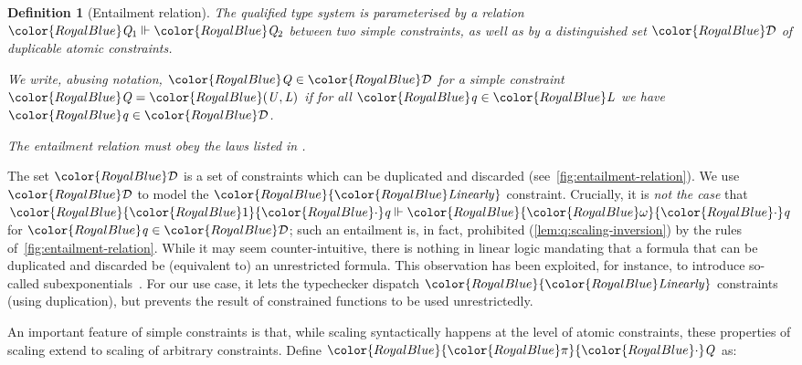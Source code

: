 \documentclass[acmsmall,usenames,dvipsnames,natbib=false,acmthm=false,screen]{acmart}
\newcommand{\Conid}[1]{\mathit{#1}}
\newcommand{\info}[2][1=]{}
\newcommand{\constraintcolour}{\color{RoyalBlue}}
\newcommand{\constraintfont}[1]{{\constraintcolour#1}}
\newcommand{\multiplicitycolour}{\color{RoyalBlue}}
\newcommand{\multiplicityfont}[1]{{\multiplicitycolour#1}}
\newcommand{\scale}{\constraintfont{\cdot}}
\theoremstyle{acmplain}
\theoremstyle{acmdefinition}
\newtheorem{definition}[theorem]{Definition}
\begin{document}
\begin{definition}[Entailment relation]
  \label{def:entailment-relation}
  The qualified type system is parameterised by a relation
  $ \constraintfont{ \ottnt{Q_{{\mathrm{1}}}} }   \Vdash   \constraintfont{ \ottnt{Q_{{\mathrm{2}}}} } $ between two simple constraints, as well as by a
  distinguished set $ \constraintfont{\mathcal{D} } $ of duplicable atomic constraints.

  We write, abusing notation, $  \constraintfont{ \ottnt{Q} }   \in  \constraintfont{\mathcal{D} } $ for a simple constraint
  $  \constraintfont{ \ottnt{Q} }  =  \constraintfont{ \ottsym{(}  \ottnt{U}  \ottsym{,}  \ottnt{L}  \ottsym{)} }  $ if for all $  \constraintfont{ \ottnt{q} }  \in  \constraintfont{ \ottnt{L} }  $ we
  have $  \constraintfont{ \ottnt{q} }   \in  \constraintfont{\mathcal{D} } $.

  The entailment relation must obey the laws listed in
  .
\end{definition}
%
\info{See Fig 3, p14 of OutsideIn\cite{OutsideIn}.}
%
The set $ \constraintfont{\mathcal{D} } $ is a set of constraints which can be duplicated and
discarded (see~\cref{fig:entailment-relation}). We use $ \constraintfont{\mathcal{D} } $ to
model the \ensuremath{\constraintfont{\constraintfont{\Conid{Linearly}}}} constraint. Crucially, it is \emph{not
  the case} that $ \constraintfont{   \multiplicityfont{ \ottsym{1} }  \scale \ottnt{q}  }   \Vdash   \constraintfont{   \multiplicityfont{ \omega }  \scale \ottnt{q}  } $ for $  \constraintfont{ \ottnt{q} }   \in  \constraintfont{\mathcal{D} } $; such an
entailment is, in fact, prohibited (\cref{lem:q:scaling-inversion}) by
the rules of~\cref{fig:entailment-relation}. While it may seem
counter-intuitive, there is nothing in linear logic mandating that a
formula that can be duplicated and discarded be (equivalent to) an
unrestricted formula. This observation has been exploited, for
instance, to introduce so-called
subexponentials~\cite{subexponentials}. For our use case, it lets the
typechecker dispatch \ensuremath{\constraintfont{\constraintfont{\Conid{Linearly}}}} constraints (using
duplication), but prevents the result of constrained functions to be used
unrestrictedly.

An important feature of simple constraints is that, while scaling
syntactically happens at the level of atomic constraints, these properties
of scaling extend to scaling of arbitrary constraints. Define
$  \constraintfont{   \multiplicityfont{ \pi }  \scale \ottnt{Q}  }  $ as:
\end{document}
